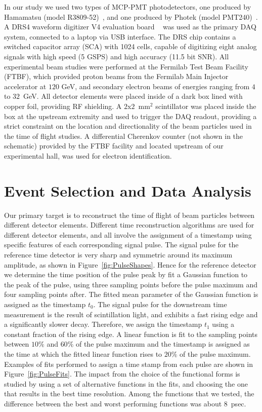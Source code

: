 In our study we used two types of MCP-PMT photodetectors, one produced by Hamamatsu 
(model R3809-52)~\cite{HamamatsuMCP3809}, and one produced by Photek (model
PMT240)~\cite{Photek240}. A DRS4  waveform digitizer V4 evaluation
board ~\cite{DRS4} was used as the primary DAQ system, connected to a laptop via
USB interface.  The DRS chip contains a switched capacitor array (SCA) with 1024 cells, 
capable of digitizing eight analog signals with high speed (5 GSPS) and high 
accuracy (11.5 bit SNR). All experimental beam studies were performed at the Fermilab Test
Beam Facility (FTBF), which provided proton beams from the Fermilab Main
Injector accelerator at $120$ GeV, and secondary electron beams of energies
ranging from $4$ to $32$~GeV. All detector elements were placed inside of a dark box
lined with copper foil, providing RF shielding. A $2$x$2$~$\mathrm{mm}^{2}$
scintillator was placed inside the box at the upstream extremity and used to
trigger the DAQ readout, providing a strict constraint on the
location and directionality of the beam particles used in the time of flight
studies. A differential Cherenkov counter (not shown in the schematic)  provided by the FTBF
facility and located upstream of our experimental hall,  was used for electron
identification. 

\section{Event Selection and Data Analysis}

Our primary target is to reconstruct the time of flight of beam particles between
different detector elements. Different time reconstruction algorithms are used
for different detector elements, and all involve the assignment of a timestamp
using specific features of each corresponding signal pulse. The signal pulse for
the reference time detector is very sharp and symmetric around its maximum
amplitude, as shown in Figure~\ref{fig:PulseShapes}. Hence for the reference
detector we determine the time position of the pulse peak by fit a Gaussian
function to the peak of the pulse, using three sampling points before the pulse
maximum and four sampling points after. The fitted mean parameter of the
Gaussian function is assigned as the timestamp $t_{0}$. The signal pulse for the
downstream time measurement is the result of scintillation light, and exhibits a
fast rising edge and a significantly slower decay. Therefore, we assign the
timestamp $t_{1}$ using a constant fraction of the rising edge. A linear
function is fit to the sampling points between $10\%$ and $60\%$ of the pulse
maximum and the timestamp is assigned as the time at which the fitted linear
function rises to $20\%$ of the pulse maximum. Examples of fits performed to
assign a time stamp from each pulse are shown in Figure~\ref{fig:PulseFits}. The
impact from the choice of the functional forms is studied by using a set of
alternative functions in the fits, and choosing the one that results in the best
time resolution. Among the functions that we tested, the difference between the
best and worst performing functions was about 8~psec.

